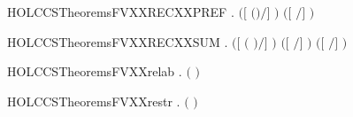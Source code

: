\begin{SaveVerbatim}{HOLCCSTheoremsFVXXRECXXPREF}
\HOLTokenTurnstile{} \HOLSymConst{\HOLTokenForall{}}   .  \ensuremath{(}\ensuremath{[}  \ensuremath{(}\HOLSymConst{\ensuremath{\ldotp}}\ensuremath{)}\ensuremath{/}\ensuremath{]} \ensuremath{)} \HOLSymConst{\ensuremath{=}}  \ensuremath{(}\ensuremath{[}  \ensuremath{/}\ensuremath{]} \ensuremath{)}
\end{SaveVerbatim}
\newcommand{\HOLCCSTheoremsFVXXRECXXPREF}{\UseVerbatim{HOLCCSTheoremsFVXXRECXXPREF}}
\begin{SaveVerbatim}{HOLCCSTheoremsFVXXRECXXSUM}
\HOLTokenTurnstile{} \HOLSymConst{\HOLTokenForall{}}   .
        \ensuremath{(}\ensuremath{[}  \ensuremath{(} \HOLSymConst{\ensuremath{+}} \ensuremath{)}\ensuremath{/}\ensuremath{]} \ensuremath{)} \HOLSymConst{\ensuremath{=}}
        \ensuremath{(}\ensuremath{[}  \ensuremath{/}\ensuremath{]} \ensuremath{)} \HOLConst{\HOLTokenUnion{}}  \ensuremath{(}\ensuremath{[}  \ensuremath{/}\ensuremath{]} \ensuremath{)}
\end{SaveVerbatim}
\newcommand{\HOLCCSTheoremsFVXXRECXXSUM}{\UseVerbatim{HOLCCSTheoremsFVXXRECXXSUM}}
\begin{SaveVerbatim}{HOLCCSTheoremsFVXXrelab}
\HOLTokenTurnstile{} \HOLSymConst{\HOLTokenForall{}} .  \ensuremath{(}  \ensuremath{)} \HOLSymConst{\ensuremath{=}}  
\end{SaveVerbatim}
\newcommand{\HOLCCSTheoremsFVXXrelab}{\UseVerbatim{HOLCCSTheoremsFVXXrelab}}
\begin{SaveVerbatim}{HOLCCSTheoremsFVXXrestr}
\HOLTokenTurnstile{} \HOLSymConst{\HOLTokenForall{}} .  \ensuremath{(}  \ensuremath{)} \HOLSymConst{\ensuremath{=}}  
\end{SaveVerbatim}
